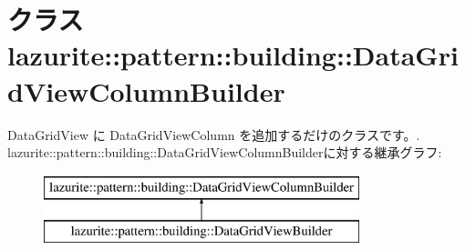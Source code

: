 \hypertarget{classlazurite_1_1pattern_1_1building_1_1_data_grid_view_column_builder}{
\section{クラス lazurite::pattern::building::DataGridViewColumnBuilder}
\label{classlazurite_1_1pattern_1_1building_1_1_data_grid_view_column_builder}
}


DataGridView に DataGridViewColumn を追加するだけのクラスです。.  
lazurite::pattern::building::DataGridViewColumnBuilderに対する継承グラフ:\begin{figure}[H]
\begin{center}
\leavevmode
\includegraphics[height=2cm]{classlazurite_1_1pattern_1_1building_1_1_data_grid_view_column_builder}
\end{center}
\end{figure}
